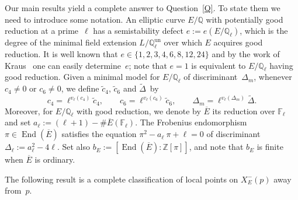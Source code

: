 \documentclass[12pt]{amsart}
\numberwithin{equation}{section}
\theoremstyle{definition}
\newcommand{\F}{\mathbb{F}}
\newcommand{\Q}{\mathbb{Q}}
\newcommand{\Z}{\mathbb{Z}}
\newcommand{\Xp}{X_E^{-}(p)}
\newcommand{\Qun}{\mathbb Q_\ell^{\text{un}}}
\DeclareMathOperator{\End}{End}
\newcommand{\oE}{\overline{E}}
\begin{document}
Our main results yield a complete answer to Question~\ref{Q}. 
To state them we need to introduce some notation. An elliptic curve $E/\Q$ with potentially good reduction at a prime~$\ell$ has a semistability defect $e:=e(E/\Q_\ell)$, which is the degree of the minimal field extension $L/\Qun$ over which $E$ acquires good reduction. It is well known that
$e \in \{1, 2,3,4,6,8,12,24 \}$
and by the work of Kraus~\cite{Kraus} one can easily determine~$e$; note that $e=1$ is equivalent to $E/\Q_\ell$ having good reduction. Given a minimal model for $E/\Q_\ell$ of discriminant~$\Delta_m$, whenever $c_4 \neq 0$ or $c_6 \neq 0$,
we define $\tilde{c}_4$, $\tilde{c}_6$
and $\tilde{\Delta}$~by
\[
 c_4 = \ell^{v_\ell(c_4)} \tilde{c}_4, \qquad c_6 = \ell^{v_\ell(c_6)} \tilde{c}_6, \qquad \Delta_m = \ell^{v_\ell(\Delta_m)}\tilde{\Delta}. 
\]
Moreover, for $E/\Q_\ell$ with good reduction, we denote by $\oE$ its reduction over $\F_\ell$ and set $a_\ell:=(\ell+1) - \# \oE(\F_\ell)$. 
The Frobenius endomorphism $\pi\in \End(\oE)$ satisfies the equation $\pi^2-a_\ell \:\pi+\ell=0$ of discriminant 
$\Delta_\ell := a_\ell^2 - 4\ell$. Set also $b_E:=[\End (\oE): \Z[{\pi}]]$, and
note that $b_E$ is finite when $\oE$ is ordinary.

The following result is a complete classification of local points on $\Xp$ away from~$p$.
\end{document}
